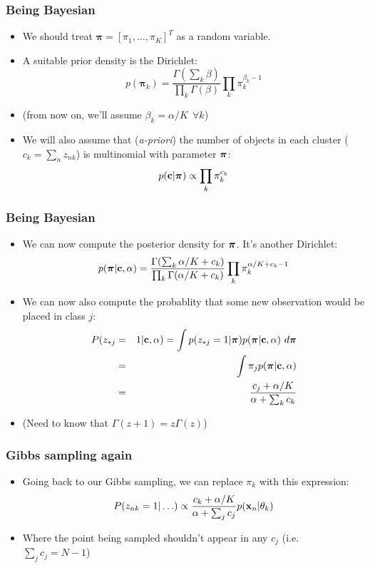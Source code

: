 \begin{frame}
	\frametitle{Being Bayesian}
	\begin{itemize}
		\item We should treat $\boldsymbol\pi = [\pi_1,\ldots,\pi_K]^T$ as a random variable.
		\item A suitable prior density is the Dirichlet:
		\[
			p(\boldsymbol\pi_k)  = \frac{\Gamma(\sum_k \beta)}{\prod_k \Gamma(\beta)}\prod_k \pi_k^{\beta_k-1}
		\]
		\item (from now on, we'll assume $\beta_k = \alpha/K~~\forall k$)
		\item<2->We will also assume that (\emph{a-priori}) the number of objects in each cluster ($c_k = \sum_n z_{nk}$) is multinomial with parameter $\boldsymbol\pi$:
		\[
			p(\mathbf{c}|\boldsymbol\pi) \propto \prod_k \pi_k^{c_k}
		\]
	\end{itemize}
\end{frame}

\begin{frame}
	\frametitle{Being Bayesian}
	\begin{itemize}
		\item We can now compute the posterior density for $\boldsymbol\pi$. It's another Dirichlet:
		\[
			p(\boldsymbol\pi|\mathbf{c},\alpha) =  \frac{\Gamma(\sum_k \alpha/K+c_k)}{\prod_k \Gamma(\alpha/K+c_k)}\prod_k \pi_k^{\alpha/K+c_k-1}
		\]
		\item<2->We can now also compute the probablity that some new observation would be placed in class $j$:
		\begin{eqnarray}
			\nonumber P(z_{*j} &=& 1|\mathbf{c},\alpha) = \int p(z_{*j}=1|\boldsymbol\pi)p(\boldsymbol\pi|\mathbf{c},\alpha)~d\boldsymbol\pi\\
			\nonumber &=& \int \pi_j p(\boldsymbol\pi|\mathbf{c},\alpha)\\
			\nonumber &=& \frac{c_j + \alpha/K}{\alpha + \sum_k c_k}
		\end{eqnarray}
		\item<2-> (Need to know that $\Gamma(z+1) = z\Gamma(z)$)
	\end{itemize}
\end{frame}

\begin{frame}
	\frametitle{Gibbs sampling again}
	\begin{itemize}
		\item Going back to our Gibbs sampling, we can replace $\pi_k$ with this expression:
		\[
			P(z_{nk}=1|\ldots)\propto \frac{c_k + \alpha/K}{\alpha + \sum_j c_j} p(\mathbf{x}_n|\theta_k)
		\]
		\item Where the point being sampled shouldn't appear in any $c_j$ (i.e. $\sum_j c_j = N-1$)
	\end{itemize}
\end{frame}

